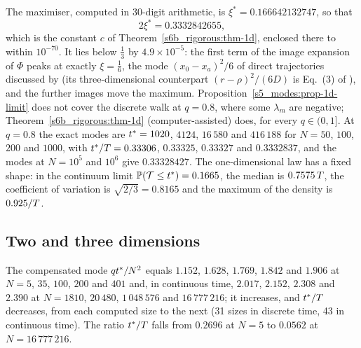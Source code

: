 The maximiser, computed in 30-digit arithmetic, is $\xi^{*}=0.166642132747$, so that
\begin{equation}\label{s5_modes:eq-1d-ratio}
  2\xi^{*}=0.3332842655 ,
\end{equation}
which is the constant $c$ of Theorem~\ref{s6b_rigorous:thm-1d}, enclosed there to within $10^{-70}$. It lies below
$\tfrac13$ by $4.9\times10^{-5}$: the first term of the image expansion of $\Phi$ peaks at exactly $\xi=\tfrac16$, the
mode $(x_0-x_a)^{2}/6$ of direct trajectories discussed by \citet{GodecMetzler2016} (its three-dimensional
counterpart $(r-\rho)^{2}/(6D)$ is Eq.~(3) of \citet{Grebenkov2018}), and the further images move the maximum.
Proposition~\ref{s5_modes:prop-1d-limit} does not cover the discrete walk at $q=0.8$, where some $\lambda_m$ are
negative; Theorem~\ref{s6b_rigorous:thm-1d} (computer-assisted) does, for every $q\in(0,1]$. At $q=0.8$ the exact modes are
$t^{*}=1020$, $4124$, $16\,580$ and $416\,188$ for $N=50$, $100$, $200$ and $1000$, with $t^{*}/T=0.33306$,
$0.33325$, $0.33327$ and $0.3332837$, and the modes at $N=10^{5}$ and $10^{6}$ give $0.33328427$.
The one-dimensional law has a fixed shape: in the continuum limit $\mathbb{P}(\mathcal{T}\le t^{*})=0.1665$, the median is
$0.7575\,T$, the coefficient of variation is $\sqrt{2/3}=0.8165$ and the maximum of the density is $0.925/T$.

\subsection{Two and three dimensions}\label{s5_modes:ssec-2d}

\begin{observation}\label{s5_modes:obs-2d}
The compensated mode $qt^{*}/N^{2}$ equals $1.152$, $1.628$, $1.769$, $1.842$ and $1.906$ at $N=5$, $35$, $100$,
$200$ and $401$ and, in continuous time, $2.017$, $2.152$, $2.308$ and $2.390$ at $N=1810$, $20\,480$, $1\,048\,576$
and $16\,777\,216$; it increases, and $t^{*}/T$ decreases, from each computed size to the next (31 sizes in
discrete time, 43 in continuous time). The ratio $t^{*}/T$ falls from $0.2696$ at $N=5$ to $0.0562$ at
$N=16\,777\,216$.
\end{observation}

